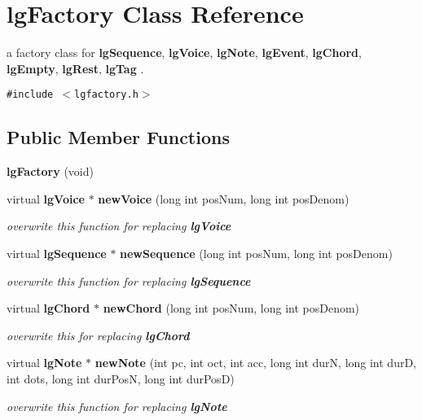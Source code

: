\section{lg\-Factory Class Reference}
\label{classlgFactory}
a factory class for {\bf lg\-Sequence}, {\bf lg\-Voice}, {\bf lg\-Note}, {\bf lg\-Event}, {\bf lg\-Chord}, {\bf lg\-Empty}, {\bf lg\-Rest}, {\bf lg\-Tag} .  


{\tt \#include $<$lgfactory.h$>$}

\subsection*{Public Member Functions}
\begin{CompactItemize}
\item 
{\bf lg\-Factory} (void)
\item 
virtual {\bf lg\-Voice} $\ast$ {\bf new\-Voice} (long int pos\-Num, long int pos\-Denom)
\begin{CompactList}\small\item\em overwrite this function for replacing {\bf lg\-Voice} \item\end{CompactList}\item 
virtual {\bf lg\-Sequence} $\ast$ {\bf new\-Sequence} (long int pos\-Num, long int pos\-Denom)
\begin{CompactList}\small\item\em overwrite this function for replacing {\bf lg\-Sequence} \item\end{CompactList}\item 
virtual {\bf lg\-Chord} $\ast$ {\bf new\-Chord} (long int pos\-Num, long int pos\-Denom)
\begin{CompactList}\small\item\em overwrite this for replacing {\bf lg\-Chord} \item\end{CompactList}\item 
virtual {\bf lg\-Note} $\ast$ {\bf new\-Note} (int pc, int oct, int acc, long int dur\-N, long int dur\-D, int dots, long int dur\-Pos\-N, long int dur\-Pos\-D)
\begin{CompactList}\small\item\em overwrite this function for replacing {\bf lg\-Note} \item\end{CompactList}\item 

\end{CompactItemize}

